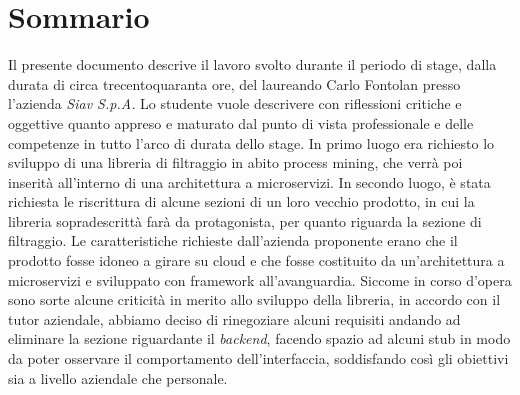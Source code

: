
\cleardoublepage
{}
{}
\begingroup
\let\clearpage\relax
\let\cleardoublepage\relax
\let\cleardoublepage\relax

\chapter*{Sommario}

Il presente documento descrive il lavoro svolto durante il periodo di stage, dalla durata di circa trecentoquaranta ore, del laureando Carlo Fontolan presso l'azienda \textit{Siav S.p.A.}
Lo studente vuole descrivere con riflessioni critiche e oggettive quanto appreso e maturato dal punto di vista professionale e delle competenze in tutto l'arco di durata dello stage.
In primo luogo era richiesto lo sviluppo di una libreria di filtraggio in abito process mining, che verrà poi inserità all'interno di una architettura a microservizi.
In secondo luogo, è stata richiesta le riscrittura di alcune sezioni di un loro vecchio prodotto, in cui la libreria sopradescrittà farà da protagonista, per quanto riguarda la sezione di filtraggio. Le caratteristiche richieste dall’azienda proponente erano che il prodotto fosse idoneo a girare su cloud e che fosse costituito da un’architettura a microservizi e sviluppato con framework all'avanguardia.
Siccome in corso d'opera sono sorte alcune criticità in merito allo sviluppo della libreria, in accordo con il tutor aziendale, abbiamo deciso di rinegoziare alcuni requisiti andando ad eliminare la sezione riguardante il  \textit{backend}, facendo spazio ad alcuni stub in modo da poter osservare il comportamento dell'interfaccia, soddisfando così gli obiettivi sia a livello aziendale che personale. 


%
%

\endgroup			

\vfill

